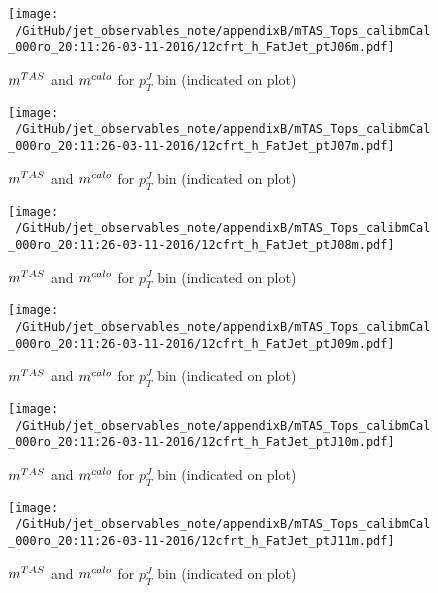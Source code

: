 \begin{figure}
 
\texttt{[image: ~/GitHub/jet\_observables\_note/appendixB/mTAS\_Tops\_calibmCal\_000ro\_20:11:26-03-11-2016/12cfrt\_h\_FatJet\_ptJ06m.pdf]}
\caption{$m^{TAS}$ and $m^{calo}$ for $p_{T}^{J}$ bin (indicated on plot) }
 
\end{figure}
\begin{figure}
 
\texttt{[image: ~/GitHub/jet\_observables\_note/appendixB/mTAS\_Tops\_calibmCal\_000ro\_20:11:26-03-11-2016/12cfrt\_h\_FatJet\_ptJ07m.pdf]}
\caption{$m^{TAS}$ and $m^{calo}$ for $p_{T}^{J}$ bin (indicated on plot) }
 
\end{figure}
 
\begin{figure}
 
\texttt{[image: ~/GitHub/jet\_observables\_note/appendixB/mTAS\_Tops\_calibmCal\_000ro\_20:11:26-03-11-2016/12cfrt\_h\_FatJet\_ptJ08m.pdf]}
\caption{$m^{TAS}$ and $m^{calo}$ for $p_{T}^{J}$ bin (indicated on plot) }
 
\end{figure}
 
\begin{figure}
 
\texttt{[image: ~/GitHub/jet\_observables\_note/appendixB/mTAS\_Tops\_calibmCal\_000ro\_20:11:26-03-11-2016/12cfrt\_h\_FatJet\_ptJ09m.pdf]}
\caption{$m^{TAS}$ and $m^{calo}$ for $p_{T}^{J}$ bin (indicated on plot) }
 
\end{figure}
 
\begin{figure}
 
\texttt{[image: ~/GitHub/jet\_observables\_note/appendixB/mTAS\_Tops\_calibmCal\_000ro\_20:11:26-03-11-2016/12cfrt\_h\_FatJet\_ptJ10m.pdf]}
\caption{$m^{TAS}$ and $m^{calo}$ for $p_{T}^{J}$ bin (indicated on plot) }
 
\end{figure}
 
\begin{figure}
 
\texttt{[image: ~/GitHub/jet\_observables\_note/appendixB/mTAS\_Tops\_calibmCal\_000ro\_20:11:26-03-11-2016/12cfrt\_h\_FatJet\_ptJ11m.pdf]}
\caption{$m^{TAS}$ and $m^{calo}$ for $p_{T}^{J}$ bin (indicated on plot) }
 
\end{figure}
 
